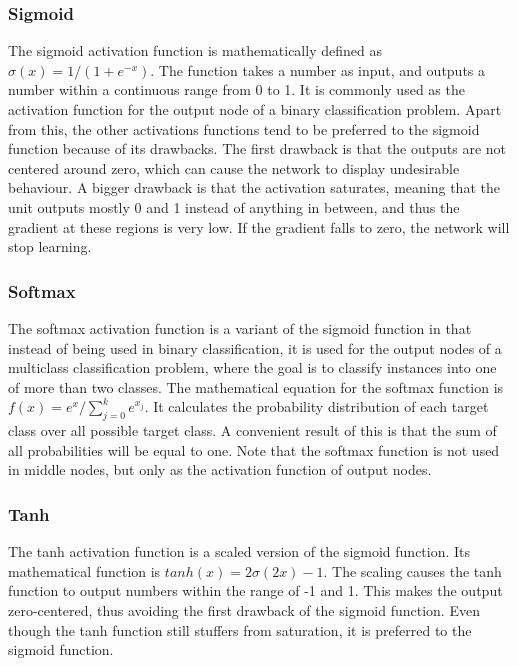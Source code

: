 \subsubsection{Sigmoid}

The sigmoid activation function is mathematically defined as $\sigma(x) = 1/(1 + e^{-x})$. The function takes a number as input, and outputs a number within a continuous range from 0 to 1. It is commonly used as the activation function for the output node of a binary classification problem. Apart from this, the other activations functions tend to be preferred to the sigmoid function because of its drawbacks. The first drawback is that the outputs are not centered around zero, which can cause the network to display undesirable behaviour. A bigger drawback is that the activation saturates, meaning that the unit outputs mostly 0 and 1 instead of anything in between, and thus the gradient at these regions is very low. If the gradient falls to zero, the network will stop learning.

\subsubsection{Softmax}

The softmax activation function is a variant of the sigmoid function in that instead of being used in binary classification, it is used for the output nodes of a multiclass classification problem, where the goal is to classify instances into one of more than two classes. The mathematical equation for the softmax function is $f(x) = e^x/\sum_{j=0}^k e^{x_j}$. It calculates the probability distribution of each target class over all possible target class. A convenient result of this is that the sum of all probabilities will be equal to one. Note that the softmax function is not used in middle nodes, but only as the activation function of output nodes.

\subsubsection{Tanh}

The tanh activation function is a scaled version of the sigmoid function. Its mathematical function is $tanh(x) = 2\sigma(2x) - 1$. The scaling causes the tanh function to output numbers within the range of -1 and 1. This makes the output zero-centered, thus avoiding the first drawback of the sigmoid function. Even though the tanh function still stuffers from saturation, it is preferred to the sigmoid function.

